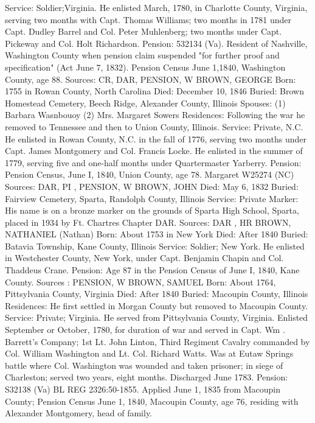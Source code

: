 Service: Soldier;Virginia. He enlisted March, 1780, in Charlotte County, Virginia, serving two months with Capt. Thomas Williams; two months in 1781 under Capt. Dudley Barrel and Col. Peter Muhlenberg; two months under Capt. Pickeway and Col. Holt Richardson. 
Pension: 532134 (Va). Resident of Nashville, Washington County when pension claim suspended "for further proof and specification" (Act June 7, 1832). Pension Census June 1,1840, Washington County, age 88. 
Sources: CR, DAR, PENSION, W 
BROWN, GEORGE 
Born: 1755 in Rowan County, North Carolina 
Died: December 10, 1846 
Buried: Brown Homestead Cemetery, Beech Ridge, Alexander County, Illinois 
Spouses: (1) Barbara Wasnbouoy 
    (2) Mrs. Margaret Sowers 
Residences: Following the war he removed to Tennessee and then to Union County, Illinois. 
Service: Private, N.C. He enlisted in Rowan County, N.C. in the fall of 1776, serving two months under Capt. James Montgomery and Col. Francis Locke. He enlisted in the summer of 1779, serving five and one-half months under Quartermaster Yarberry. 
Pension: Pension Census, June I, 1840, Union County, age 78. Margaret W25274 (NC) 
Sources: DAR, PI , PENSION, W 
BROWN, JOHN 
Died: May 6, 1832 
Buried: Fairview Cemetery, Sparta, Randolph County, Illinois Service: Private 
Marker: His name is on a bronze marker on the grounds of Sparta High School, Sparta, placed in 1934 by Ft. Chartres Chapter DAR. 
Sources: DAR , HR 
BROWN, NATHANIEL (Nathan) 
Born: About 1753 in New York 
Died: After 1840 
Buried: Batavia Township, Kane County, Illinois 
Service: Soldier; New York. He enlisted in Westchester County, New York, under Capt. Benjamin Chapin and Col. Thaddeus Crane. 
Pension: Age 87 in the Pension Census of June I, 1840, Kane County. 
Sources : PENSION, W 
BROWN, SAMUEL 
Born: About 1764, Pittsylvania County, Virginia 
Died: After 1840 
Buried: Macoupin County, Illinois Residences: He first settled in Morgan County but removed to Macoupin County. 
Service: Private; Virginia. He served from Pittsylvania County, Virginia. Enlisted 
September or October, 1780, for duration of war and served in Capt. Wm . Barrett's Company; 1st Lt. John Linton, Third Regiment Cavalry commanded by Col. William Washington and Lt. Col. Richard Watts. Was at Eutaw Springs battle where Col. Washington was wounded and taken prisoner; in siege of Charleston; served two years, eight months. Discharged June 1783. 
Pension: S32138 (Va) BL REG 2326:50-1855. Applied June 1, 1835 from Macoupin County; Pension Census June 1, 1840, Macoupin County, age 76, residing with Alexander Montgomery, head of family. 
